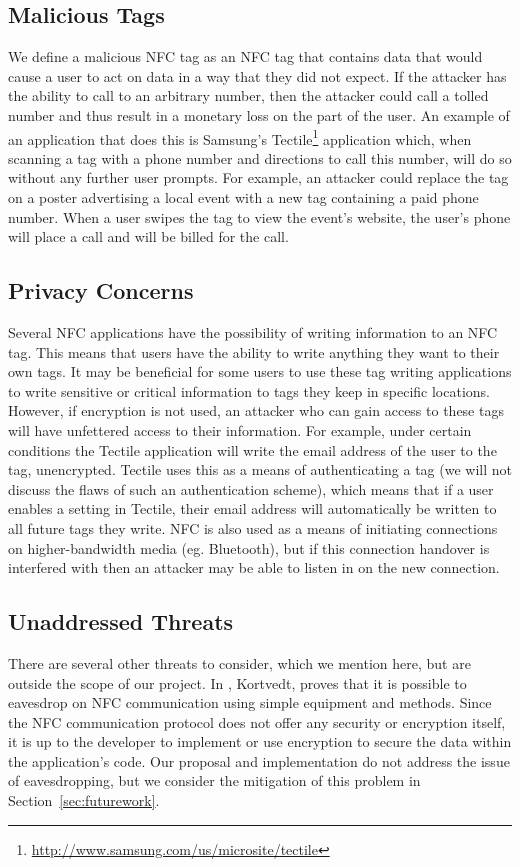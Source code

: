 \documentclass[12pt]{article}
\begin{document}
\subsection{Malicious Tags}
We define a malicious NFC tag as an NFC tag that contains data that would cause a user to act on data in a way that they did not expect.
If the attacker has the ability to call to an arbitrary number, then the attacker could call a tolled number and thus result in a monetary loss on the part of the user. 
An example of an application that does this is Samsung's Tectile\footnote{\url{http://www.samsung.com/us/microsite/tectile}} application which, when scanning a tag with a phone number and directions to call this number, will do so without any further user prompts.
For example, an attacker could replace the tag on a poster advertising a local event with a new tag containing a paid phone number.
When a user swipes the tag to view the event's website, the user's phone will place a call and will be billed for the call.

\subsection{Privacy Concerns}
Several NFC applications have the possibility of writing information to an NFC tag.
This means that users have the ability to write anything they want to their own tags.
It may be beneficial for some users to use these tag writing applications to write sensitive or critical information to tags they keep in specific locations.
However, if encryption is not used, an attacker who can gain access to these tags will have unfettered access to their information.
For example, under certain conditions the Tectile application will write the email address of the user to the tag, unencrypted.
Tectile uses this as a means of authenticating a tag (we will not discuss the flaws of such an authentication scheme), which means that if a user enables a setting in Tectile, their email address will automatically be written to all future tags they write.
NFC is also used as a means of initiating connections on higher-bandwidth media (eg. Bluetooth), but if this connection handover is interfered with then an attacker may be able to listen in on the new connection.

\subsection{Unaddressed Threats}
There are several other threats to consider, which we mention here, but are outside the scope of our project.
In \cite{kortvedt2009}, Kortvedt, proves that it is possible to eavesdrop on NFC communication using simple equipment and methods.
Since the NFC communication protocol does not offer any security or encryption itself, it is up to the developer to implement or use encryption to secure the data within the application's code. 
Our proposal and implementation do not address the issue of eavesdropping, but we consider the mitigation of this problem in Section~\ref{sec:futurework}.
\end{document}
